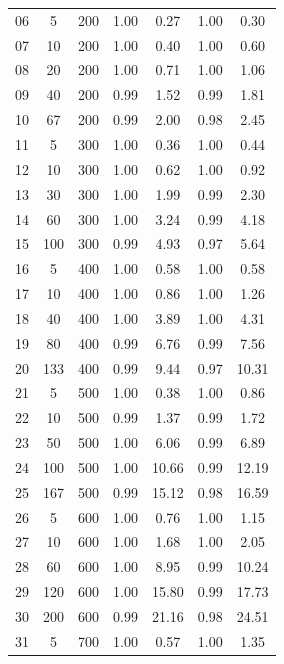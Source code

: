 \documentclass[11pt]{article}
\begin{document}
\begin{table}[]
\begin{tabular}{ccccccc}
			06 & 5 & 200 & 1.00 & 0.27 & 1.00 & 0.30 \\
			07 & 10 & 200 & 1.00 & 0.40 & 1.00 & 0.60 \\
			08 & 20 & 200 & 1.00 & 0.71 & 1.00 & 1.06 \\
			09 & 40 & 200 & 0.99 & 1.52 & 0.99 & 1.81 \\
			10 & 67 & 200 & 0.99 & 2.00 & 0.98 & 2.45 \\
			\rowcolor[HTML]{EFEFEF} 
			11 & 5 & 300 & 1.00 & 0.36 & 1.00 & 0.44 \\
			\rowcolor[HTML]{EFEFEF} 
			12 & 10 & 300 & 1.00 & 0.62 & 1.00 & 0.92 \\
			\rowcolor[HTML]{EFEFEF} 
			13 & 30 & 300 & 1.00 & 1.99 & 0.99 & 2.30 \\
			\rowcolor[HTML]{EFEFEF} 
			14 & 60 & 300 & 1.00 & 3.24 & 0.99 & 4.18 \\
			\rowcolor[HTML]{EFEFEF} 
			15 & 100 & 300 & 0.99 & 4.93 & 0.97 & 5.64 \\
			16 & 5 & 400 & 1.00 & 0.58 & 1.00 & 0.58 \\
			17 & 10 & 400 & 1.00 & 0.86 & 1.00 & 1.26 \\
			18 & 40 & 400 & 1.00 & 3.89 & 1.00 & 4.31 \\
			19 & 80 & 400 & 0.99 & 6.76 & 0.99 & 7.56 \\
			20 & 133 & 400 & 0.99 & 9.44 & 0.97 & 10.31 \\
			\rowcolor[HTML]{EFEFEF} 
			21 & 5 & 500 & 1.00 & 0.38 & 1.00 & 0.86 \\
			\rowcolor[HTML]{EFEFEF} 
			22 & 10 & 500 & 0.99 & 1.37 & 0.99 & 1.72 \\
			\rowcolor[HTML]{EFEFEF} 
			23 & 50 & 500 & 1.00 & 6.06 & 0.99 & 6.89 \\
			\rowcolor[HTML]{EFEFEF} 
			24 & 100 & 500 & 1.00 & 10.66 & 0.99 & 12.19 \\
			\rowcolor[HTML]{EFEFEF} 
			25 & 167 & 500 & 0.99 & 15.12 & 0.98 & 16.59 \\
			26 & 5 & 600 & 1.00 & 0.76 & 1.00 & 1.15 \\
			27 & 10 & 600 & 1.00 & 1.68 & 1.00 & 2.05 \\
			28 & 60 & 600 & 1.00 & 8.95 & 0.99 & 10.24 \\
			29 & 120 & 600 & 1.00 & 15.80 & 0.99 & 17.73 \\
			30 & 200 & 600 & 0.99 & 21.16 & 0.98 & 24.51 \\
			\rowcolor[HTML]{EFEFEF} 
			31 & 5 & 700 & 1.00 & 0.57 & 1.00 & 1.35 \\

\end{tabular}
\end{table}
\end{document}
